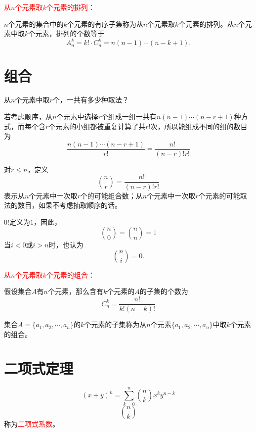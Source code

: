 \documentclass[12pt,a4paper]{article}
\begin{document}
\textcolor{red}{从$n$个元素取$k$个元素的排列}：

$n$个元素的集合中的$k$个元素的有序子集称为从$n$个元素取$k$个元素的排列。从$n$个元素中取$k$个元素，排列的个数等于
\begin{equation}
A_n^k = k! \cdot C_n^k = n(n-1)\cdots (n-k+1).
\end{equation}



\section{组合}
从$n$个元素中取$r$个，一共有多少种取法？

若考虑顺序，从$n$个元素中选择$r$个组成一组一共有$n(n-1)\cdots(n-r+1)$种方式，而每个含$r$个元素的小组都被重复计算了共$r!$次，所以能组成不同的组的数目为
\begin{equation}
\frac{n(n-1)\cdots(n-r+1)}{r!} = \frac{n!}{(n-r)!r!}
\end{equation}

对$r \leqslant n$，定义
\begin{equation}
\binom n r = \frac{n!}{(n-r)! r!}
\end{equation}
表示从$n$个元素中一次取$r$个的可能组合数；从$n$个元素中一次取$r$个元素的可能取法的数目，如果不考虑抽取顺序的话。

$0!$定义为$1$，因此，
\begin{equation}
\binom n 0 = \binom n n = 1
\end{equation}
当$i < 0$或$i > n$时，也认为
\begin{equation}
\binom n i = 0.
\end{equation}

\textcolor{red}{从$n$个元素取$k$个元素的组合}：

假设集合$A$有$n$个元素，那么含有$k$个元素的$A$的子集的个数为
\begin{equation}
C_n^k = \frac{n!}{k! (n-k)!}
\end{equation}

集合$A = \{a_1, a_2, \cdots, a_n\}$的$k$个元素的子集称为从$n$个元素$\{a_1, a_2, \cdots, a_n\}$中取$k$个元素的组合。

\section{二项式定理}
\begin{equation}
(x+y)^n = \sum_{k=0}^n \binom n k x^k y^{n-k}
\end{equation}
\begin{equation}
\binom n k
\end{equation}
称为\textcolor{red}{二项式系数}。
\end{document}
